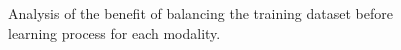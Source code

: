 \begin{landscape}
\begin{figure}
  \hfill
  \hspace*{\fill}
  \caption{Analysis of the benefit of balancing the training dataset before learning process for each modality.}
  \label{fig:res-Ex3-bal}
\end{figure}


\end{landscape}

